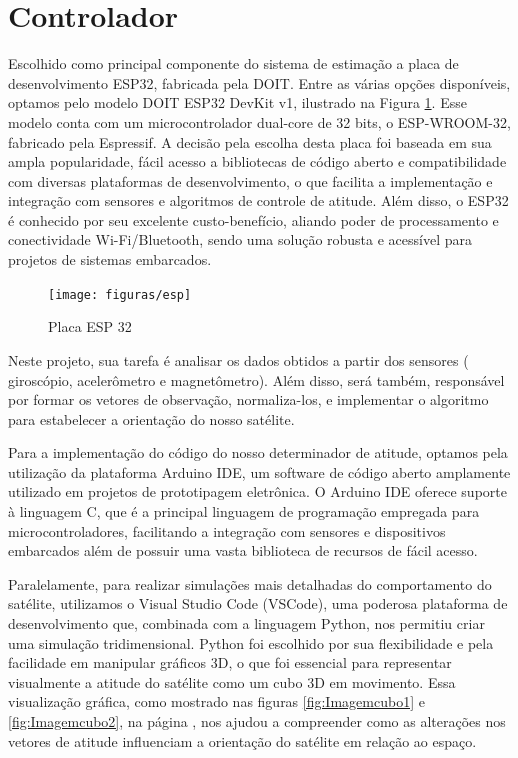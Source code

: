\documentclass[
	12pt,				%
	openright,			%
	oneside,			%
	a4paper,			%
	english,			%
	brazil				%
	]{abntex2}
\begin{document}
\section{Controlador}


Escolhido como principal componente do sistema de estimação a placa de desenvolvimento ESP32, fabricada pela DOIT. Entre as várias opções disponíveis, optamos pelo modelo DOIT ESP32 DevKit v1, ilustrado na Figura \ref{fig:esp}. Esse modelo conta com um microcontrolador dual-core de 32 bits, o ESP-WROOM-32, fabricado pela Espressif. A decisão pela escolha desta placa foi baseada em sua ampla popularidade, fácil acesso a bibliotecas de código aberto e compatibilidade com diversas plataformas de desenvolvimento, o que facilita a implementação e integração com sensores e algoritmos de controle de atitude. Além disso, o ESP32 é conhecido por seu excelente custo-benefício, aliando poder de processamento e conectividade Wi-Fi/Bluetooth, sendo uma solução robusta e acessível para projetos de sistemas embarcados.

\begin{figure}[h]
	\centering
	\texttt{[image: figuras/esp]}
	\caption[ESP32]{Placa ESP 32}
	\label{fig:esp}
\end{figure}

Neste projeto, sua tarefa é analisar os dados obtidos a partir dos sensores ( giroscópio, acelerômetro e magnetômetro). Além disso, será também, responsável por formar os vetores de observação, normaliza-los, e implementar o algoritmo para estabelecer a orientação do nosso satélite.

Para a implementação do código do nosso determinador de atitude, optamos pela utilização da plataforma Arduino IDE, um software de código aberto amplamente utilizado em projetos de prototipagem eletrônica. O Arduino IDE oferece suporte à linguagem C, que é a principal linguagem de programação empregada para microcontroladores, facilitando a integração com sensores e dispositivos embarcados além de possuir uma vasta biblioteca de recursos de fácil acesso. 

Paralelamente, para realizar simulações mais detalhadas do comportamento do satélite, utilizamos o Visual Studio Code (VSCode), uma poderosa plataforma de desenvolvimento que, combinada com a linguagem Python, nos permitiu criar uma simulação tridimensional. Python foi escolhido por sua flexibilidade e pela facilidade em manipular gráficos 3D, o que foi essencial para representar visualmente a atitude do satélite como um cubo 3D em movimento. Essa visualização gráfica, como mostrado nas figuras \ref{fig:Imagemcubo1} e \ref{fig:Imagemcubo2}, na página \pageref{fig:Imagemcubo1}, nos ajudou a compreender como as alterações nos vetores de atitude influenciam a orientação do satélite em relação ao espaço.
\end{document}
